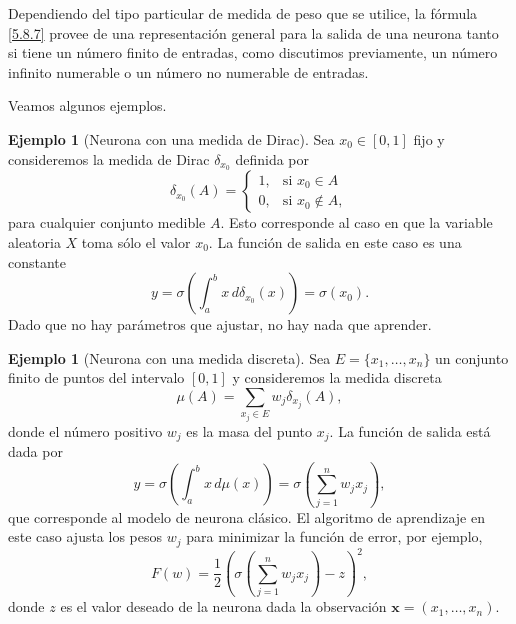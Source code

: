 \documentclass[12pt, a4paper]{amsbook}
\newcommand{\xx}{{\mathbf x}}
\theoremstyle{remark}
\theoremstyle{definition}
\newtheorem{ejem}[teo]{Ejemplo}
\numberwithin{section}{chapter}
\numberwithin{subsection}{section}
\numberwithin{equation}{section}
\numberwithin{figure}{chapter}
\begin{document}
Dependiendo del tipo particular de medida de peso que se utilice, la fórmula \eqref{5.8.7} provee de una representación general para la salida de una neurona tanto si tiene un número finito de entradas, como discutimos previamente, un número infinito numerable o un número no numerable de entradas. 

Veamos algunos ejemplos.
\begin{ejem}[Neurona con una medida de Dirac]
Sea $x_0\in [0,1]$ fijo y consideremos la medida de Dirac $\delta_{x_0}$ definida por
$$
\delta_{x_0}(A) = \begin{cases}
1, & \text{si } x_0\in A\\
0, & \text{si } x_0\not\in A,
\end{cases}
$$
para cualquier conjunto medible $A$. Esto corresponde al caso en que la variable aleatoria $X$ toma sólo el valor $x_0$. La función de salida en este caso es una constante
$$
y=\sigma\left(\int_a^b x\, d\delta_{x_0}(x)\right) = \sigma(x_0).
$$
Dado que no hay parámetros que ajustar, no hay nada que aprender.
\end{ejem}

\begin{ejem}[Neurona con una medida discreta]
Sea $E=\{x_1,\dots,x_n\}$ un conjunto finito de puntos del intervalo $[0,1]$ y consideremos la medida discreta
$$
\mu(A) = \sum_{x_j\in E} w_j \delta_{x_j}(A),
$$
donde el número positivo $w_j$ es la masa del punto $x_j$. La función de salida está dada por
$$
y=\sigma\left(\int_a^b x\, d\mu(x)\right) = \sigma\left(\sum_{j=1}^n w_j x_j\right),
$$
que corresponde al modelo de neurona clásico. El algoritmo de aprendizaje en este caso ajusta los pesos $w_j$ para minimizar la función de error, por ejemplo,
$$
F(w) = \frac12 \left(\sigma\left(\sum_{j=1}^n w_j x_j\right) - z\right)^2,
$$
donde $z$ es el valor deseado de la neurona dada la observación $\xx = (x_1,\dots, x_n)$.
\end{ejem}
\end{document}

